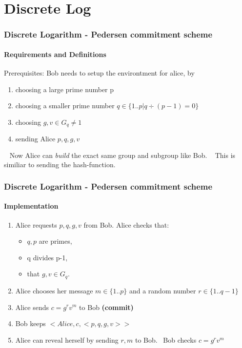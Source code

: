 \section{Discrete Log}
\begin{frame}
	\frametitle{Discrete Logarithm - Pedersen commitment scheme}
	\framesubtitle{Requirements and Definitions}
	Prerequisites: Bob needs to setup the environtment for alice, by 
	\begin{Large}
		\begin{enumerate}
			\item choosing a large prime number p
			\item choosing a smaller prime number $q \in \{1..p| q\div (p-1) = 0\}$
			\item choosing $g,v \in G_q \neq 1$
			\item sending Alice $p,q,g,v$ 
		\end{enumerate}
	\end{Large}
	~\newline
	Now Alice can \textit{build} the exact same group and subgroup like Bob. ~\newline
	This is similiar to sending the hash-function.  
\end{frame}

\begin{frame}
	\frametitle{Discrete Logarithm - Pedersen commitment scheme}
	\framesubtitle{Implementation}
	\begin{Large}
			\begin{enumerate}
			\item Alice requests $p,q,g,v$ from Bob. \newline Alice checks that:
			\begin{itemize}
				\item $q,p$ are primes, 
				\item q divides p-1, 
				\item that $g,v \in G_q$. 
			\end{itemize}
			\item Alice chooses her message $m \in \{1..p\}$ and a random number $r \in \{1..q-1\}$
			\item Alice sends $c = g^rv^m$ to Bob \textbf{(commit)}
			\item Bob keeps $<Alice,c,<p,q,g,v>>$
			\item Alice can reveal herself by sending $r,m$ to Bob. ~\newline Bob checks $c = g^rv^m$
		\end{enumerate}
	\end{Large}
\end{frame}

